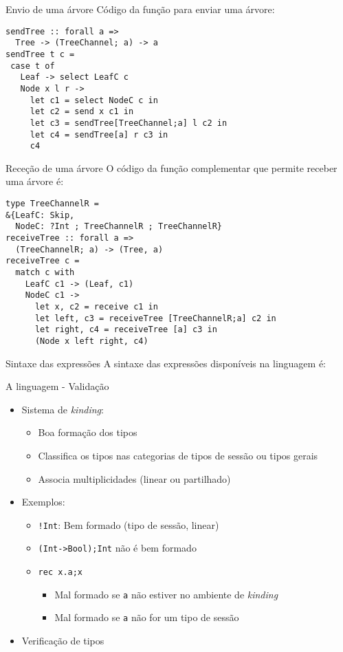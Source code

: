 \begin{frame}[fragile]{Envio de uma árvore}
  Código da função para enviar uma árvore:
    \vskip 0.5cm
  \begin{lstlisting}
sendTree :: forall a =>
  Tree -> (TreeChannel; a) -> a
sendTree t c =
 case t of
   Leaf -> select LeafC c
   Node x l r ->
     let c1 = select NodeC c in
     let c2 = send x c1 in
     let c3 = sendTree[TreeChannel;a] l c2 in
     let c4 = sendTree[a] r c3 in
     c4
\end{lstlisting}
\end{frame}

\begin{frame}[fragile]{Receção de uma árvore}
  O código da função complementar que permite receber uma árvore é:
  \begin{lstlisting}
type TreeChannelR =
&{LeafC: Skip,
  NodeC: ?Int ; TreeChannelR ; TreeChannelR}
receiveTree :: forall a =>
  (TreeChannelR; a) -> (Tree, a)
receiveTree c =
  match c with
    LeafC c1 -> (Leaf, c1)
    NodeC c1 ->
      let x, c2 = receive c1 in
      let left, c3 = receiveTree [TreeChannelR;a] c2 in
      let right, c4 = receiveTree [a] c3 in
      (Node x left right, c4)
\end{lstlisting}
\end{frame}

\begin{frame}[fragile, shrink=20]{Sintaxe das expressões}
  \vskip 1cm
  A sintaxe das expressões disponíveis na linguagem é:
  
\end{frame}

\begin{frame}[fragile]{A linguagem - Validação}
  \begin{itemize}
  \item Sistema de \textit{kinding}:
    \begin{itemize}
    \item Boa formação dos tipos
    \item Classifica os tipos nas categorias de tipos de sessão ou tipos gerais
    \item Associa multiplicidades (linear ou partilhado)
    \end{itemize}
  \item Exemplos:
    \begin{itemize}
    \item \lstinline|!Int|: Bem formado (tipo de sessão, linear) %
    \item \lstinline|(Int->Bool);Int| não é bem formado
    \item \lstinline|rec x.a;x|
      \begin{itemize}
      \item Mal formado se \lstinline|a| não estiver no ambiente de \textit{kinding}
      \item Mal formado se \lstinline|a| não for um tipo de sessão
      \end{itemize}
    \end{itemize}
    
  \item Verificação de tipos
  \end{itemize}
\end{frame}
  
